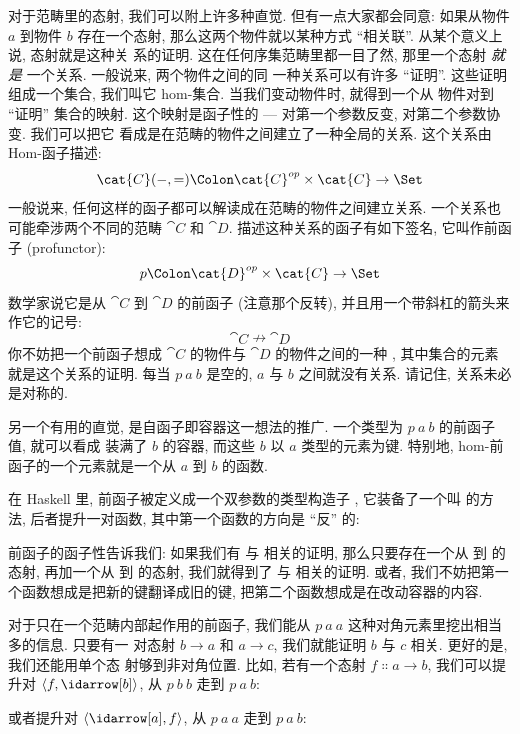 
\lettrine[lhang=0.17]{对}{于范畴里的态射}, 我们可以附上许多种直觉. 但有一点大家都会同意: 如果从物件
$a$ 到物件 $b$ 存在一个态射, 那么这两个物件就以某种方式 ``相关联''. 从某个意义上说, 态射就是这种关
系的证明. 这在任何序集范畴里都一目了然, 那里一个态射 \emph{就是} 一个关系. 一般说来, 两个物件之间的同
一种关系可以有许多 ``证明''. 这些证明组成一个集合, 我们叫它 hom-集合. 当我们变动物件时, 就得到一个从
物件对到 ``证明'' 集合的映射. 这个映射是函子性的 --- 对第一个参数反变, 对第二个参数协变. 我们可以把它
看成是在范畴的物件之间建立了一种全局的关系. 这个关系由 Hom-函子描述:
\[\cat{C}(-, =) \Colon \cat{C}^{op}\times{}\cat{C} \to \Set\]
一般说来, 任何这样的函子都可以解读成在范畴的物件之间建立关系. 一个关系也可能牵涉两个不同的范畴
$\cat{C}$ 和 $\cat{D}$. 描述这种关系的函子有如下签名, 它叫作前函子 (profunctor):
\[p \Colon \cat{D}^{op}\times{}\cat{C} \to \Set\]
数学家说它是从 $\cat{C}$ 到 $\cat{D}$ 的前函子 (注意那个反转), 并且用一个带斜杠的箭头来作它的记号:
\[\cat{C} \nrightarrow \cat{D}\]
你不妨把一个前函子想成 $\cat{C}$ 的物件与 $\cat{D}$ 的物件之间的一种 , 其中集合的元素就是这个关系的证明. 每当 $p\ a\ b$ 是空的, $a$ 与 $b$
之间就没有关系. 请记住, 关系未必是对称的.

另一个有用的直觉, 是自函子即容器这一想法的推广. 一个类型为 $p\ a\ b$ 的前函子值, 就可以看成
装满了 $b$ 的容器, 而这些 $b$ 以 $a$ 类型的元素为键. 特别地, hom-前函子的一个元素就是一个从
$a$ 到 $b$ 的函数.

在 Haskell 里, 前函子被定义成一个双参数的类型构造子 , 它装备了一个叫  的方
法, 后者提升一对函数, 其中第一个函数的方向是 ``反'' 的:

前函子的函子性告诉我们: 如果我们有  与  相关的证明, 那么只要存在一个从 
到  的态射, 再加一个从  到  的态射, 我们就得到了  与 
相关的证明. 或者, 我们不妨把第一个函数想成是把新的键翻译成旧的键, 把第二个函数想成是在改动容器的内容.

对于只在一个范畴内部起作用的前函子, 我们能从 $p\ a\ a$ 这种对角元素里挖出相当多的信息. 只要有一
对态射 $b \to a$ 和 $a \to c$, 我们就能证明 $b$ 与 $c$ 相关. 更好的是, 我们还能用单个态
射够到非对角位置. 比如, 若有一个态射 $f \Colon a \to b$, 我们可以提升对
$\langle f, \idarrow[b] \rangle$, 从 $p\ b\ b$ 走到 $p\ a\ b$:

或者提升对 $\langle \idarrow[a], f \rangle$, 从 $p\ a\ a$ 走到 $p\ a\ b$:

